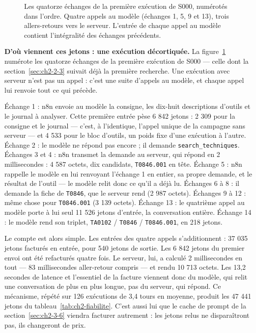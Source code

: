 \begin{figure}[htbp]
\centering
{}
\caption{Les quatorze échanges de la première exécution de S000, numérotés dans l'ordre. Quatre appels au modèle (échanges 1, 5, 9 et 13), trois allers-retours vers le serveur. L'entrée de chaque appel au modèle contient l'intégralité des échanges précédents.}\label{fig:ch2-echanges}
\end{figure}

\textbf{D'où viennent ces jetons : une exécution décortiquée.} La figure~\ref{fig:ch2-echanges} numérote les quatorze échanges de la première exécution de S000 --- celle dont la section~\ref{sec:ch2-2-3} suivait déjà la première recherche. Une exécution avec serveur n'est pas un appel : c'est une suite d'appels au modèle, et chaque appel lui renvoie tout ce qui précède.

Échange 1 : n8n envoie au modèle la consigne, les dix-huit descriptions d'outils et le journal à analyser. Cette première entrée pèse 6 842 jetons : 2 309 pour la consigne et le journal --- c'est, à l'identique, l'appel unique de la campagne sans serveur --- et 4 533 pour le bloc d'outils, un poids fixe d'une exécution à l'autre. Échange 2 : le modèle ne répond pas encore ; il demande \texttt{search\_techniques}. Échanges 3 et 4 : n8n transmet la demande au serveur, qui répond en 2 millisecondes : 4 587 octets, dix candidats, \texttt{T0846.001} en tête. Échange 5 : n8n rappelle le modèle en lui renvoyant l'échange 1 en entier, sa propre demande, et le résultat de l'outil --- le modèle relit donc ce qu'il a déjà lu. Échanges 6 à 8 : il demande la fiche de \texttt{T0846}, que le serveur rend (2 987 octets). Échanges 9 à 12 : même chose pour \texttt{T0846.001} (3 139 octets). Échange 13 : le quatrième appel au modèle porte à lui seul 11 526 jetons d'entrée, la conversation entière. Échange 14 : le modèle rend son triplet, \texttt{TA0102} / \texttt{T0846} / \texttt{T0846.001}, en 218 jetons.

Le compte est alors simple. Les entrées des quatre appels s'additionnent : 37 035 jetons facturés en entrée, pour 540 jetons de sortie. Les 6 842 jetons du premier envoi ont été refacturés quatre fois. Le serveur, lui, a calculé 2 millisecondes en tout --- 83 millisecondes aller-retour compris --- et rendu 10 713 octets. Les 13,2 secondes de latence et l'essentiel de la facture viennent donc du modèle, qui relit une conversation de plus en plus longue, pas du serveur, qui répond. Ce mécanisme, répété sur 126 exécutions de 3,4 tours en moyenne, produit les 47 441 jetons du tableau~\ref{tab:ch2-fiabilite}. C'est aussi lui que le cache de prompt de la section~\ref{sec:ch2-3-6} viendra facturer autrement : les jetons relus ne disparaîtront pas, ils changeront de prix.

